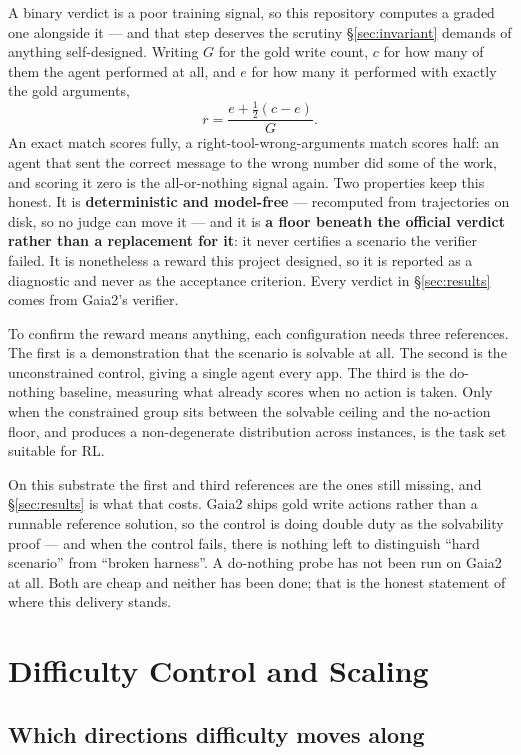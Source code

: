 \documentclass[11pt,a4paper]{article}
\begin{document}
A binary verdict is a poor training signal, so this repository computes a graded one alongside it --- and that step deserves the scrutiny \S\ref{sec:invariant} demands of anything self-designed. Writing $G$ for the gold write count, $c$ for how many of them the agent performed at all, and $e$ for how many it performed with exactly the gold arguments,
\[
  r=\frac{e+\tfrac{1}{2}(c-e)}{G}.
\]
An exact match scores fully, a right-tool-wrong-arguments match scores half: an agent that sent the correct message to the wrong number did some of the work, and scoring it zero is the all-or-nothing signal again. Two properties keep this honest. It is \textbf{deterministic and model-free} --- recomputed from trajectories on disk, so no judge can move it --- and it is \textbf{a floor beneath the official verdict rather than a replacement for it}: it never certifies a scenario the verifier failed. It is nonetheless a reward this project designed, so it is reported as a diagnostic and never as the acceptance criterion. Every verdict in \S\ref{sec:results} comes from Gaia2's verifier.

To confirm the reward means anything, each configuration needs three references. The first is a demonstration that the scenario is solvable at all. The second is the unconstrained control, giving a single agent every app. The third is the do-nothing baseline, measuring what already scores when no action is taken. Only when the constrained group sits between the solvable ceiling and the no-action floor, and produces a non-degenerate distribution across instances, is the task set suitable for RL.

On this substrate the first and third references are the ones still missing, and \S\ref{sec:results} is what that costs. Gaia2 ships gold write actions rather than a runnable reference solution, so the control is doing double duty as the solvability proof --- and when the control fails, there is nothing left to distinguish ``hard scenario'' from ``broken harness''. A do-nothing probe has not been run on Gaia2 at all. Both are cheap and neither has been done; that is the honest statement of where this delivery stands.

\section{Difficulty Control and Scaling}

\subsection{Which directions difficulty moves along}
\end{document}
